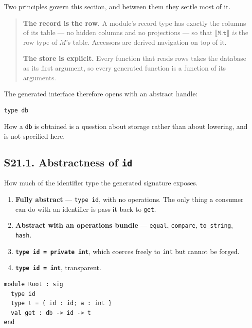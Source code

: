 Two principles govern this section, and between them they settle most of it.

\begin{quote}
\textbf{The record is the row.} A module's record type has exactly the columns
of its table --- no hidden columns and no projections --- so that
$\llbracket \texttt{M.t} \rrbracket$ \emph{is} the row type of $M$'s table.
Accessors are derived navigation on top of it.

\textbf{The store is explicit.} Every function that reads rows takes the
database as its first argument, so every generated function is a function of
its arguments.
\end{quote}

\noindent
The generated interface therefore opens with an abstract handle:

\begin{lstlisting}[style=ml]
type db
\end{lstlisting}

\noindent
How a \texttt{db} is obtained is a question about storage rather than about
lowering, and is not specified here.

\subsection*{S21.1. Abstractness of \texttt{id}}

How much of the identifier type the generated signature exposes.

\options
\begin{enumerate}[label=\textbf{(\alph*)}]
  \item \textbf{Fully abstract} --- \texttt{type id}, with no operations. The
        only thing a consumer can do with an identifier is pass it back to
        \texttt{get}. \selected
  \item \textbf{Abstract with an operations bundle} --- \texttt{equal},
        \texttt{compare}, \texttt{to\_string}, \texttt{hash}.
  \item \textbf{\texttt{type id = private int}}, which coerces freely to
        \texttt{int} but cannot be forged.
  \item \textbf{\texttt{type id = int}}, transparent.
\end{enumerate}


\begin{lstlisting}[style=ml]
module Root : sig
  type id
  type t = { id : id; a : int }
  val get : db -> id -> t
end
\end{lstlisting}

